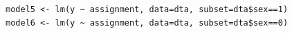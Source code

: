 \documentclass[a4paper]{article}
\begin{document}

\subsection{} %

\begin{verbatim}
model5 <- lm(y ~ assignment, data=dta, subset=dta$sex==1)
model6 <- lm(y ~ assignment, data=dta, subset=dta$sex==0)
\end{verbatim}
\end{document}
